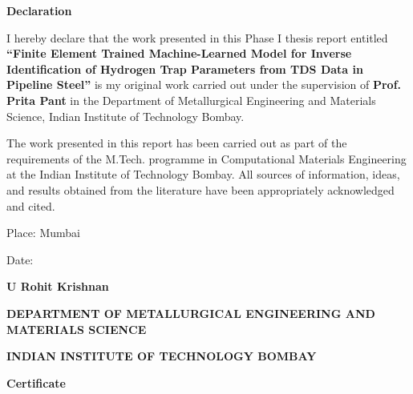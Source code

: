 \documentclass[a4paper,12pt,oneside]{report}
\begin{document}

\newpage

\begin{center}
{\large\bf Declaration}
\end{center}

I hereby declare that the work presented in this Phase I thesis report entitled
\textbf{``Finite Element Trained Machine-Learned Model for Inverse Identification of Hydrogen Trap Parameters from TDS Data in Pipeline Steel''}
is my original work carried out under the supervision of
\textbf{Prof. Prita Pant} in the Department of Metallurgical Engineering and Materials Science, Indian Institute of Technology Bombay.

The work presented in this report has been carried out as part of the requirements of the M.Tech. programme in Computational Materials Engineering at the Indian Institute of Technology Bombay. All sources of information, ideas, and results obtained from the literature have been appropriately acknowledged and cited.

\vspace{1cm}

Place: Mumbai

\vspace{0.25cm}

Date:

\vspace{1cm}

\hspace{9cm}
\textbf{U Rohit Krishnan}


\newpage

\thispagestyle{empty}

\begin{center}

{\large\bf
DEPARTMENT OF METALLURGICAL ENGINEERING AND MATERIALS SCIENCE
}

\vspace{0.15cm}

{\large\bf
INDIAN INSTITUTE OF TECHNOLOGY BOMBAY
}

\vspace{1cm}

{\Large\bf Certificate}

\vspace{0.5cm}

\end{center}
\end{document}
